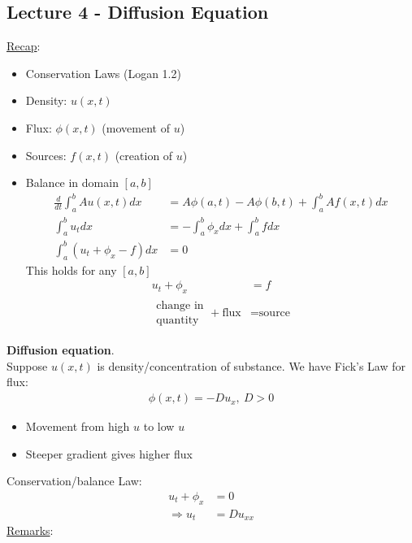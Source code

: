 \documentclass[12pt, letterpaper]{article}
\begin{document}
\subsection{Lecture 4 - Diffusion Equation}
\underline{Recap}:
\begin{itemize}
    \item Conservation Laws (Logan 1.2)
    \item Density: $u(x,t)$
    \item Flux: $\phi(x,t)$ (movement of $u$)
    \item Sources: $f(x,t)$ (creation of $u$)
    \item Balance in domain $[a,b]$
    \begin{align*}
        \frac{d}{dt}\int_{a}^{b}Au(x,t)dx &= A\phi(a,t) - A\phi(b,t) + \int_{a}^{b}Af(x,t)dx \\
        \int_{a}^{b}u_tdx &= - \int_{a}^{b}\phi_xdx + \int_{a}^{b}fdx \\
        \int_{a}^{b}(u_t + \phi_x - f)dx &= 0
    \end{align*}
    This holds for any $[a,b]$
    \begin{align*}
        u_t + \phi_x &= f \\
        \begin{matrix}
            \text{change in} \\ \text{quantity}
        \end{matrix}
         + \text{flux} &= \text{source}
    \end{align*}
\end{itemize}
\textbf{Diffusion equation}. \\
Suppose $u(x,t)$ is density/concentration of substance. We have Fick's Law for flux:
\begin{align*}
    \phi(x,t) = -Du_x,\ D > 0
\end{align*}
\begin{itemize}
    \item Movement from high $u$ to low $u$
    \item Steeper gradient gives higher flux 
\end{itemize}
Conservation/balance Law: 
\begin{align*}
    u_t + \phi_x &= 0 \\
    \Rightarrow u_t &= Du_{xx} \tag{Diffusion/heat eq}
\end{align*}
\underline{Remarks}:
\end{document}
